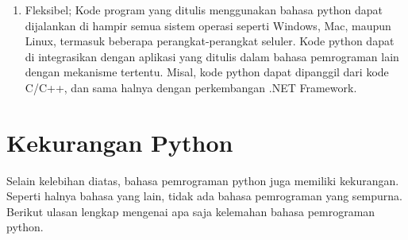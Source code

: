 \begin{enumerate}
\item Fleksibel; Kode program yang ditulis menggunakan bahasa python dapat dijalankan di hampir semua sistem operasi seperti Windows, Mac, maupun Linux, termasuk beberapa perangkat-perangkat seluler. Kode python dapat di integrasikan dengan aplikasi yang ditulis dalam bahasa pemrograman lain dengan mekanisme tertentu. Misal, kode python dapat dipanggil dari kode C/C++, dan sama halnya dengan perkembangan .NET Framework.
\end{enumerate}

\section{Kekurangan Python}
Selain kelebihan diatas, bahasa pemrograman python juga memiliki kekurangan. Seperti halnya bahasa yang lain, tidak ada bahasa pemrograman yang sempurna. Berikut ulasan lengkap mengenai apa saja kelemahan bahasa pemrograman python.
